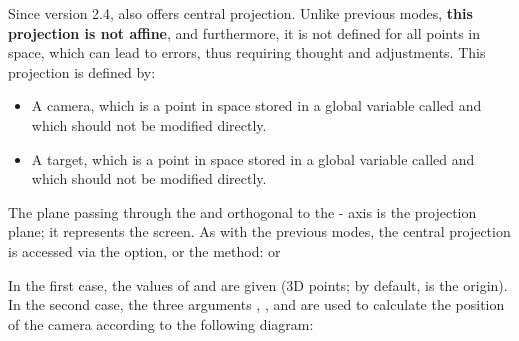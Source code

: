 Since version 2.4, \luadrawenv also offers central projection. Unlike previous modes, \textbf{this projection is not affine}, and furthermore, it is not defined for all points in space, which can lead to errors, thus requiring thought and adjustments. This projection is defined by:

\begin{itemize}
    \item A camera, which is a point in space stored in a global variable called  and which should not be modified directly.
    \item A target, which is a point in space stored in a global variable called  and which should not be modified directly.
\end{itemize}


The plane passing through the  and orthogonal to the  -  axis is the projection plane; it represents the screen. As with the previous modes, the central projection is accessed via the  option, or the  method:
or

In the first case, the values ​​of  and  are given (3D points; by default,  is the origin). In the second case, the three arguments , , and  are used to calculate the position of the camera according to the following diagram:

